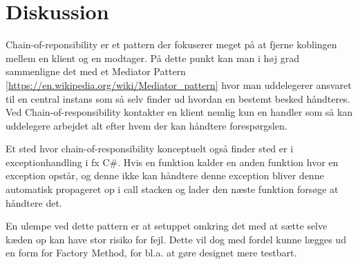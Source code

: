 \chapter{Diskussion}
Chain-of-reponsibility er et pattern der fokuserer meget på at fjerne koblingen mellem en klient og en modtager. På dette punkt kan man i høj grad sammenligne det med et Mediator Pattern \ref{https://en.wikipedia.org/wiki/Mediator_pattern} hvor man uddelegerer ansvaret til en central instans som så selv finder ud hvordan en bestemt besked håndteres.
Ved Chain-of-responsibility kontakter en klient nemlig kun en handler som så kan uddelegere arbejdet alt efter hvem der kan håndtere forespørgslen.

Et sted hvor chain-of-responsibility konceptuelt også finder sted er i exceptionhandling i fx C\#. Hvis en funktion kalder en anden funktion hvor en exception opstår, og denne ikke kan håndtere denne exception bliver denne automatisk propageret op i call stacken og lader den næste funktion forsøge at håndtere det. 

En ulempe ved dette pattern er at setuppet omkring det med at sætte selve kæden op kan have stor risiko for fejl. Dette vil dog med fordel kunne lægges ud en form for Factory Method, for bl.a. at gøre designet mere testbart.